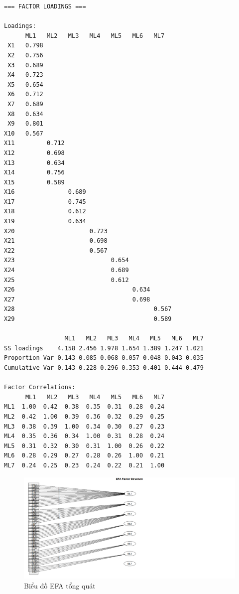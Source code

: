 \begin{lstlisting}
=== FACTOR LOADINGS ===

Loadings:
      ML1   ML2   ML3   ML4   ML5   ML6   ML7  
 X1   0.798                               
 X2   0.756                               
 X3   0.689                               
 X4   0.723                               
 X5   0.654                               
 X6   0.712                               
 X7   0.689                               
 X8   0.634                               
 X9   0.801                               
X10   0.567                               
X11         0.712                         
X12         0.698                         
X13         0.634                         
X14         0.756                         
X15         0.589                         
X16               0.689                   
X17               0.745                   
X18               0.612                   
X19               0.634                   
X20                     0.723             
X21                     0.698             
X22                     0.567             
X23                           0.654       
X24                           0.689       
X25                           0.612       
X26                                 0.634 
X27                                 0.698 
X28                                       0.567
X29                                       0.589

                 ML1   ML2   ML3   ML4   ML5   ML6   ML7
SS loadings    4.158 2.456 1.978 1.654 1.389 1.247 1.021
Proportion Var 0.143 0.085 0.068 0.057 0.048 0.043 0.035
Cumulative Var 0.143 0.228 0.296 0.353 0.401 0.444 0.479

Factor Correlations:
      ML1   ML2   ML3   ML4   ML5   ML6   ML7
ML1  1.00  0.42  0.38  0.35  0.31  0.28  0.24
ML2  0.42  1.00  0.39  0.36  0.32  0.29  0.25
ML3  0.38  0.39  1.00  0.34  0.30  0.27  0.23
ML4  0.35  0.36  0.34  1.00  0.31  0.28  0.24
ML5  0.31  0.32  0.30  0.31  1.00  0.26  0.22
ML6  0.28  0.29  0.27  0.28  0.26  1.00  0.21
ML7  0.24  0.25  0.23  0.24  0.22  0.21  1.00
\end{lstlisting}

\begin{figure}[h!]
    \centering
        \includegraphics[width=1.5\linewidth]{../../assets/images/EFA_ML.png}
        \caption{Biểu đồ EFA tổng quát}
        \label{fig:h1}
\end{figure}

